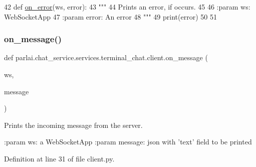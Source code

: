 \begin{DoxyCode}
42 \textcolor{keyword}{def }\hyperlink{namespaceparlai_1_1chat__service_1_1services_1_1terminal__chat_1_1client_a261a307d930994b292f713c0fafbb575}{on\_error}(ws, error):
43     \textcolor{stringliteral}{"""}
44 \textcolor{stringliteral}{    Prints an error, if occurs.}
45 \textcolor{stringliteral}{}
46 \textcolor{stringliteral}{    :param ws: WebSocketApp}
47 \textcolor{stringliteral}{    :param error: An error}
48 \textcolor{stringliteral}{    """}
49     print(error)
50 
51 
\end{DoxyCode}
\mbox{\label{namespaceparlai_1_1chat__service_1_1services_1_1terminal__chat_1_1client_a0ef2bb2bd3b966dcdd8402a92b999708}} 
\subsubsection{\texorpdfstring{on\+\_\+message()}{on\_message()}}
{\footnotesize\ttfamily def parlai.\+chat\+\_\+service.\+services.\+terminal\+\_\+chat.\+client.\+on\+\_\+message (\begin{DoxyParamCaption}\item[{}]{ws,  }\item[{}]{message }\end{DoxyParamCaption})}

\begin{DoxyVerb}Prints the incoming message from the server.

:param ws: a WebSocketApp
:param message: json with 'text' field to be printed
\end{DoxyVerb}
 

Definition at line 31 of file client.\+py.


